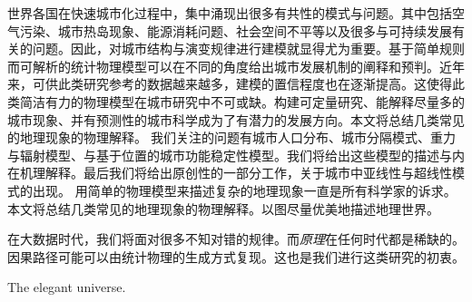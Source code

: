 
\begin{cabstract}
	世界各国在快速城市化过程中，集中涌现出很多有共性的模式与问题。其中包括空气污染、城市热岛现象、能源消耗问题、社会空间不平等以及很多与可持续发展有关的问题。因此，对城市结构与演变规律进行建模就显得尤为重要。基于简单规则而可解析的统计物理模型可以在不同的角度给出城市发展机制的阐释和预判。近年来，可供此类研究参考的数据越来越多，建模的置信程度也在逐渐提高。这使得此类简洁有力的物理模型在城市研究中不可或缺。构建可定量研究、能解释尽量多的城市现象、并有预测性的城市科学成为了有潜力的发展方向。本文将总结几类常见的地理现象的物理解释。我们关注的问题有城市人口分布、城市分隔模式、重力与辐射模型、与基于位置的城市功能稳定性模型。我们将给出这些模型的描述与内在机理解释。最后我们将给出原创性的一部分工作，关于城市中亚线性与超线性模式的出现。
	用简单的物理模型来描述复杂的地理现象一直是所有科学家的诉求。本文将总结几类常见的地理现象的物理解释。以图尽量优美地描述地理世界。

	在大数据时代，我们将面对很多不知对错的规律。而\emph{原理}在任何时代都是稀缺的。因果路径可能可以由统计物理的生成方式复现。这也是我们进行这类研究的初衷。

\end{cabstract}

\begin{eabstract}
	The elegant universe.
\end{eabstract}


